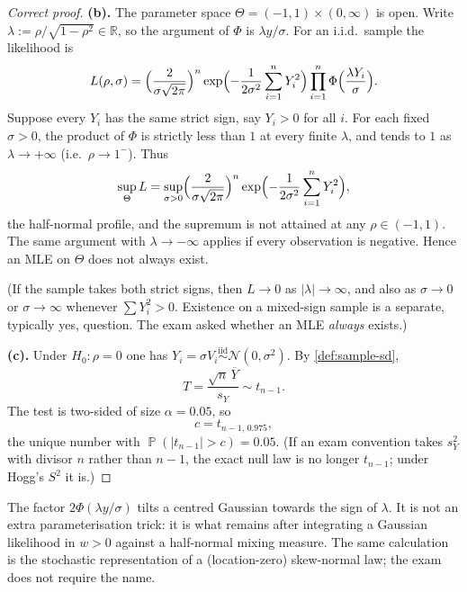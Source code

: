 \documentclass[11pt,a4paper]{article}
\DeclareMathOperator{\Pbb}{\mathbb{P}}
\begin{document}
\begin{proof}[Correct proof]
\textbf{(b).}
The parameter space \(\Theta=(-1,1)\times(0,\infty)\) is open. Write \(\lambda:=\rho/\sqrt{1-\rho^{2}}\in\mathbb{R}\), so the argument of \(\Phi\) is \(\lambda y/\sigma\). For an i.i.d.\ sample the likelihood is
\[
L(\rho,\sigma)
=
\Bigl(\frac{2}{\sigma\sqrt{2\pi}}\Bigr)^{n}
\exp\Bigl(-\frac{1}{2\sigma^{2}}\sum_{i=1}^{n}Y_{i}^{2}\Bigr)
\prod_{i=1}^{n}
\Phi\Bigl(\frac{\lambda Y_{i}}{\sigma}\Bigr).
\]
Suppose every \(Y_{i}\) has the same strict sign, say \(Y_{i}>0\) for all \(i\). For each fixed \(\sigma>0\), the product of \(\Phi\) is strictly less than \(1\) at every finite \(\lambda\), and tends to \(1\) as \(\lambda\to+\infty\) (i.e.\ \(\rho\to 1^{-}\)). Thus
\[
\sup_{\Theta}L
=
\sup_{\sigma>0}
\Bigl(\frac{2}{\sigma\sqrt{2\pi}}\Bigr)^{n}
\exp\Bigl(-\frac{1}{2\sigma^{2}}\sum_{i=1}^{n}Y_{i}^{2}\Bigr),
\]
the half-normal profile, and the supremum is not attained at any \(\rho\in(-1,1)\). The same argument with \(\lambda\to-\infty\) applies if every observation is negative. Hence an MLE on \(\Theta\) does not always exist.

(If the sample takes both strict signs, then \(L\to 0\) as \(|\lambda|\to\infty\), and also as \(\sigma\to 0\) or \(\sigma\to\infty\) whenever \(\sum Y_{i}^{2}>0\). Existence on a mixed-sign sample is a separate, typically yes, question. The exam asked whether an MLE \emph{always} exists.)

\textbf{(c).}
Under \(H_{0}:\rho=0\) one has \(Y_{i}=\sigma V_{i}\stackrel{\mathrm{iid}}{\sim}\mathcal{N}(0,\sigma^{2})\). By \cref{def:sample-sd},
\[
T
=
\frac{\sqrt{n}\,\overline{Y}}{s_{Y}}
\sim
t_{n-1}.
\]
The test is two-sided of size \(\alpha=0.05\), so
\[
c
=
t_{n-1,\,0.975},
\]
the unique number with \(\Pbb(|t_{n-1}|>c)=0.05\). (If an exam convention takes \(s_{Y}^{2}\) with divisor \(n\) rather than \(n-1\), the exact null law is no longer \(t_{n-1}\); under Hogg's \(S^{2}\) it is.)
\end{proof}

\begin{remark}
\label{rem:p11-skew}
The factor \(2\Phi(\lambda y/\sigma)\) tilts a centred Gaussian towards the sign of \(\lambda\). It is not an extra parameterisation trick: it is what remains after integrating a Gaussian likelihood in \(w>0\) against a half-normal mixing measure. The same calculation is the stochastic representation of a (location-zero) skew-normal law; the exam does not require the name.
\end{remark}
\end{document}
